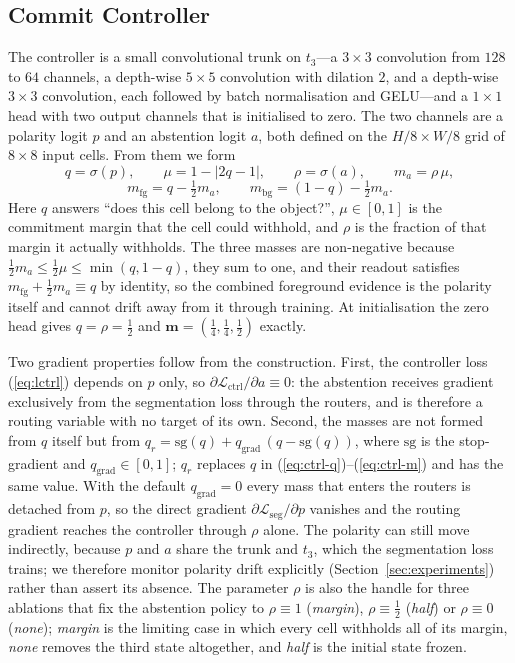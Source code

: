 \subsection{Commit Controller}
\label{sec:controller}

The controller is a small convolutional trunk on $t_3$---a $3\times3$ convolution from $128$ to $64$ channels, a depth-wise $5\times5$ convolution with dilation $2$, and a depth-wise $3\times3$ convolution, each followed by batch normalisation and GELU---and a $1\times1$ head with two output channels that is initialised to zero. The two channels are a polarity logit $p$ and an abstention logit $a$, both defined on the $H/8\times W/8$ grid of $8\times8$ input cells. From them we form
\begin{equation}
q=\sigma(p),\qquad \mu = 1-\lvert 2q-1\rvert,\qquad \rho=\sigma(a),\qquad m_a=\rho\,\mu,
\label{eq:ctrl-q}
\end{equation}
\begin{equation}
m_{\mathrm{fg}} = q-\tfrac12 m_a,\qquad m_{\mathrm{bg}} = (1-q)-\tfrac12 m_a .
\label{eq:ctrl-m}
\end{equation}
Here $q$ answers ``does this cell belong to the object?'', $\mu\in[0,1]$ is the commitment margin that the cell could withhold, and $\rho$ is the fraction of that margin it actually withholds. The three masses are non-negative because $\tfrac12 m_a\le\tfrac12\mu\le\min(q,1-q)$, they sum to one, and their readout satisfies $m_{\mathrm{fg}}+\tfrac12 m_a\equiv q$ by identity, so the combined foreground evidence is the polarity itself and cannot drift away from it through training. At initialisation the zero head gives $q=\rho=\tfrac12$ and $\mathbf m=(\tfrac14,\tfrac14,\tfrac12)$ exactly.

Two gradient properties follow from the construction. First, the controller loss (\ref{eq:lctrl}) depends on $p$ only, so $\partial\mathcal{L}_{\mathrm{ctrl}}/\partial a\equiv0$: the abstention receives gradient exclusively from the segmentation loss through the routers, and is therefore a routing variable with no target of its own. Second, the masses are not formed from $q$ itself but from $q_r=\mathrm{sg}(q)+q_{\mathrm{grad}}\,(q-\mathrm{sg}(q))$, where $\mathrm{sg}$ is the stop-gradient and $q_{\mathrm{grad}}\in[0,1]$; $q_r$ replaces $q$ in (\ref{eq:ctrl-q})--(\ref{eq:ctrl-m}) and has the same value. With the default $q_{\mathrm{grad}}=0$ every mass that enters the routers is detached from $p$, so the direct gradient $\partial\mathcal{L}_{\mathrm{seg}}/\partial p$ vanishes and the routing gradient reaches the controller through $\rho$ alone. The polarity can still move indirectly, because $p$ and $a$ share the trunk and $t_3$, which the segmentation loss trains; we therefore monitor polarity drift explicitly (Section~\ref{sec:experiments}) rather than assert its absence. The parameter $\rho$ is also the handle for three ablations that fix the abstention policy to $\rho\equiv1$ (\emph{margin}), $\rho\equiv\tfrac12$ (\emph{half}) or $\rho\equiv0$ (\emph{none}); \emph{margin} is the limiting case in which every cell withholds all of its margin, \emph{none} removes the third state altogether, and \emph{half} is the initial state frozen.

